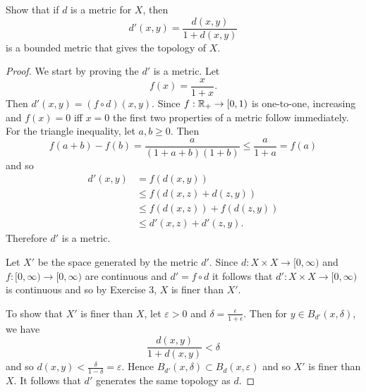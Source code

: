 \begin{ex}{20.11}
    Show that if $d$ is a metric for $X$, then 
    $$d'(x,y)=\frac{d(x,y)}{1+d(x,y)}$$
    is a bounded metric that gives the topology of $X$.
\end{ex}
\begin{proof}
    We start by proving the $d'$ is a metric. Let
    $$f(x)=\frac{x}{1+x}.$$
    Then $d'(x,y)=(f\circ d)(x,y)$. Since $f:\mathbb{R}_+\to[0,1)$ is one-to-one, increasing and $f(x)=0$ iff $x=0$ the first two properties of a metric follow immediately.
    For the triangle inequality, let $a,b\geq 0$. Then
    $$f(a+b)-f(b)=\frac{a}{(1+a+b)(1+b)}\leq\frac{a}{1+a}=f(a)$$
    and so
    \begin{align*}
        d'(x,y)&=f(d(x,y))\\
        &\leq f(d(x,z)+d(z,y))\\
        &\leq f(d(x,z))+f(d(z,y))\\
        &\leq d'(x,z)+d'(z,y).
    \end{align*}
    Therefore $d'$ is a metric.

    Let $X'$ be the space generated by the metric $d'$. Since $d:X\times X\to[0,\infty)$ and $f:[0,\infty)\to[0,\infty)$ are continuous
    and $d'=f\circ d$ it follows that $d':X\times X\to[0,\infty)$ is continuous and so by Exercise 3, $X$ is finer than $X'$.

    To show that $X'$ is finer than $X$, let $\varepsilon>0$ and $\delta=\frac{\epsilon}{1+\epsilon}$.
    Then for $y\in B_{d'}(x,\delta)$, we have
    $$\frac{d(x,y)}{1+d(x,y)}<\delta$$
    and so $d(x,y)<\frac{\delta}{1-\delta}=\varepsilon$. Hence $B_{d'}(x,\delta)\subset B_{d}(x,\varepsilon)$ and so $X'$ is finer than $X$.
    It follows that $d'$ generates the same topology as $d$.

    
    
\end{proof}